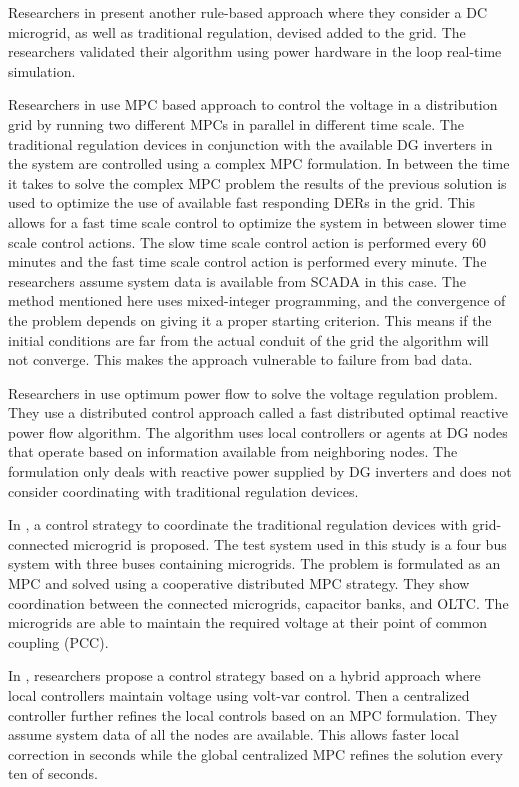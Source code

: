 \documentclass[Journal]{IEEEtran}
\begin{document}
Researchers in \cite{NLR_4} present another rule-based approach where they consider a DC microgrid, as well as traditional regulation, devised added to the grid. The researchers validated their algorithm using power hardware in the loop real-time simulation. 

Researchers in \cite{NLR_5} use MPC based approach to control the voltage in a distribution grid by running two different MPCs in parallel in different time scale. The traditional regulation devices in conjunction with the available DG inverters in the system are controlled using a complex MPC formulation. In between the time it takes to solve the complex MPC problem the results of the previous solution is used to optimize the use of available fast responding DERs in the grid. This allows for a fast time scale control to optimize the system in between slower time scale control actions. The slow time scale control action is performed every 60 minutes and the fast time scale control action is performed every minute. The researchers assume system data is available from SCADA in this case. The method mentioned here uses mixed-integer programming, and the convergence of the problem depends on giving it a proper starting criterion. This means if the initial conditions are far from the actual conduit of the grid the algorithm will not converge. This makes the approach vulnerable to failure from bad data.

Researchers in \cite{NLR_6} use optimum power flow to solve the voltage regulation problem. They use a distributed control approach called a fast distributed optimal reactive power flow algorithm. The algorithm uses local controllers or agents at DG nodes that operate based on information available from neighboring nodes. The formulation only deals with reactive power supplied by DG inverters and does not consider coordinating with traditional regulation devices. 

In \cite{NLR_7}, a control strategy to coordinate the traditional regulation devices with grid-connected microgrid is proposed. The test system used in this study is a four bus system with three buses containing microgrids. The problem is formulated as an MPC and solved using a cooperative distributed MPC strategy. They show coordination between the connected microgrids, capacitor banks, and OLTC. The microgrids are able to maintain the required voltage at their point of common coupling (PCC).

In \cite{NLR_8}, researchers propose a control strategy based on a hybrid approach where local controllers maintain voltage using volt-var control. Then a centralized controller further refines the local controls based on an MPC formulation. They assume system data of all the nodes are available. This allows faster local correction in seconds while the global centralized MPC refines the solution every ten of seconds.
\end{document}
